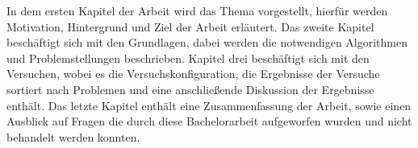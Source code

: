 In dem ersten Kapitel der Arbeit wird das Thema vorgestellt, hierfür werden Motivation, Hintergrund und Ziel der Arbeit erläutert. Das zweite Kapitel beschäftigt sich mit den Grundlagen, dabei werden die notwendigen Algorithmen und Problemstellungen beschrieben. Kapitel drei beschäftigt sich mit den Versuchen, wobei es die Versuchskonfiguration, die Ergebnisse der Versuche sortiert nach Problemen und eine anschließende Diskussion der Ergebnisse enthält. Das letzte Kapitel enthält eine Zusammenfassung der Arbeit, sowie einen Ausblick auf Fragen die durch diese Bachelorarbeit aufgeworfen wurden und nicht behandelt werden konnten.